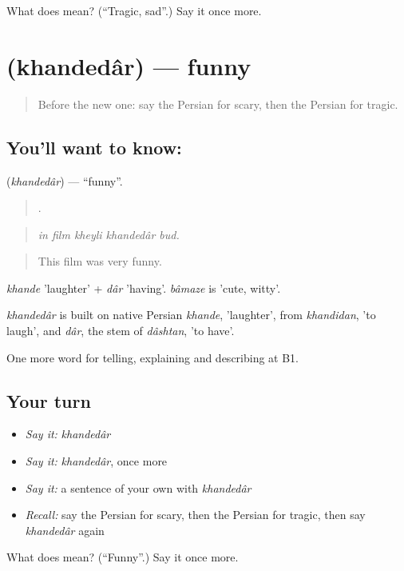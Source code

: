 \begin{tcolorbox}[breakable,colback=teal!4,colframe=teal!35!black,title={Before you move on}]
What does   mean? (\textquotedblleft{}Tragic, sad\textquotedblright{}.) Say it once more.
\end{tcolorbox}
\section[\texorpdfstring{\fa{خنده} \fa{دار} (khandedâr)}{خنده دار (khandedâr)}]{  (khandedâr) — funny}

\label{lesson:FA-C530-khandedar}



\begin{quote}
Before the new one: say the Persian for scary, then the Persian for tragic.
\end{quote}

\subsection*{You'll want to know:  }
\textbf{ } (\emph{khandedâr}) — \textquotedblleft{}funny\textquotedblright{}.

\begin{quote}
     .
\end{quote}

\begin{quote}
\emph{in film kheyli khandedâr bud.}
\end{quote}

\begin{quote}
This film was very funny.
\end{quote}

\emph{khande} 'laughter' + \emph{dâr} 'having'. \emph{bâmaze} is 'cute, witty'.

\begin{cousinweb}
\emph{khandedâr} is built on native Persian \emph{khande}, 'laughter', from \emph{khandidan}, 'to laugh', and \emph{dâr}, the stem of \emph{dâshtan}, 'to have'.
\end{cousinweb}

\begin{grammarlens}[title={What you've built}]
One more word for telling, explaining and describing at B1.
\end{grammarlens}

\subsection*{Your turn}
\begin{itemize}
\raggedright
  \item \emph{Say it:} \emph{khandedâr}
  \item \emph{Say it:} \emph{khandedâr}, once more
  \item \emph{Say it:} a sentence of your own with \emph{khandedâr}
  \item \emph{Recall:} say the Persian for scary, then the Persian for tragic, then say \emph{khandedâr} again
\end{itemize}

\begin{tcolorbox}[breakable,colback=teal!4,colframe=teal!35!black,title={Before you move on}]
What does   mean? (\textquotedblleft{}Funny\textquotedblright{}.) Say it once more.
\end{tcolorbox}
